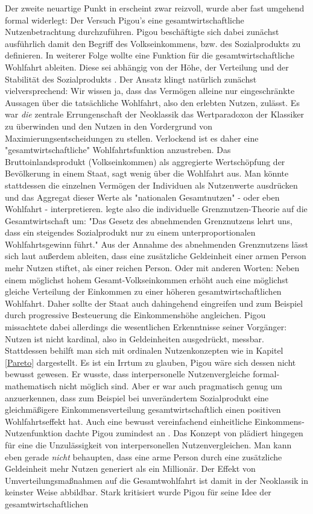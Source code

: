Der zweite neuartige Punkt in \textcite{Pigou1920} erscheint zwar reizvoll, wurde aber fast umgehend formal widerlegt: Der Versuch Pigou's eine gesamtwirtschaftliche Nutzenbetrachtung durchzuführen. Pigou beschäftigte sich dabei zunächst ausführlich damit den Begriff des Volkseinkommens, bzw. des Sozialprodukts zu definieren. In weiterer Folge wollte eine Funktion für die gesamtwirtschaftliche Wohlfahrt ableiten. Diese sei abhängig von der Höhe, der Verteilung und der Stabilität des Sozialprodukts \parencite[S. 42]{Pigou1920}. Der Ansatz klingt natürlich zunächst vielversprechend: Wir wissen ja, dass das Vermögen alleine nur eingeschränkte Aussagen über die tatsächliche Wohlfahrt, also den erlebten Nutzen, zulässt. Es war \textit{die} zentrale Errungenschaft der Neoklassik das Wertparadoxon der Klassiker zu überwinden und den Nutzen in den Vordergrund von Maximierungsentscheidungen zu stellen. Verlockend ist es daher eine "gesamtwirtschaftliche" Wohlfahrtsfunktion anzustreben. Das Bruttoinlandsprodukt (Volkseinkommen) als aggregierte Wertschöpfung der Bevölkerung in einem Staat, sagt wenig über die Wohlfahrt aus. Man könnte stattdessen die einzelnen Vermögen der Individuen als Nutzenwerte ausdrücken und das Aggregat dieser Werte als "nationalen Gesamtnutzen" - oder eben Wohlfahrt - interpretieren. \textcite[S. 48]{Pigou1920} legte also die individuelle Grenznutzen-Theorie auf die Gesamtwirtschaft um: "Das Gesetz des abnehmenden Grenznutzens lehrt uns, dass ein steigendes Sozialprodukt nur zu einem unterproportionalen Wohlfahrtsgewinn führt." Aus der Annahme des abnehmenden Grenznutzens lässt sich laut \textcite[S. 53]{Pigou1920} außerdem ableiten, dass eine zusätzliche Geldeinheit einer armen Person mehr Nutzen stiftet, als einer reichen Person. Oder mit anderen Worten: Neben einem möglichst hohem Gesamt-Volkseinkommen erhöht auch eine möglichst gleiche Verteilung der Einkommen zu einer höheren gesamtwirtschaftlichen Wohlfahrt. Daher sollte der Staat auch dahingehend eingreifen und zum Beispiel durch progressive Besteuerung die Einkommenshöhe angleichen. Pigou missachtete dabei allerdings die wesentlichen Erkenntnisse seiner Vorgänger: Nutzen ist nicht kardinal, also in Geldeinheiten ausgedrückt, messbar. Stattdessen behilft man sich mit ordinalen Nutzenkonzepten wie in Kapitel \ref{Pareto} dargestellt. Es ist ein Irrtum zu glauben, Pigou wäre sich dessen nicht bewusst gewesen. Er wusste, dass interpersonelle Nutzenvergleiche formal-mathematisch nicht möglich sind. Aber er war auch pragmatisch genug um anzuerkennen, dass zum Beispiel bei unverändertem Sozialprodukt eine gleichmäßigere Einkommensverteilung gesamtwirtschaftlich einen positiven Wohlfahrtseffekt hat. Auch eine bewusst vereinfachend einheitliche Einkommens-Nutzenfunktion dachte Pigou zumindest an \parencite[S. 237]{Pigou1920}. Das Konzept von \textcite{Pareto1906} plädiert hingegen für eine die Unzulässigkeit von interpersonellen Nutzenvergleichen. Man kann eben gerade \textit{nicht} behaupten, dass eine arme Person durch eine zusätzliche Geldeinheit mehr Nutzen generiert als ein Millionär. Der Effekt von Umverteilungsmaßnahmen auf die Gesamtwohlfahrt ist damit in der Neoklassik in keinster Weise abbildbar. Stark kritisiert \parencite[S. 123]{Robbins1932} wurde Pigou für seine Idee der gesamtwirtschaftlichen 